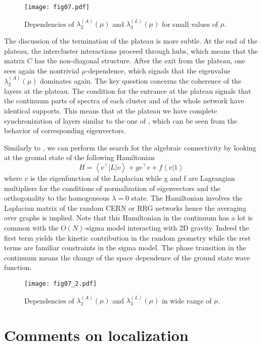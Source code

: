 \documentclass[aps,12pt]{revtex4}
\newcommand{\be}{\begin{equation}}
\newcommand{\ee}{\end{equation}}
\newcommand{\la}{\left<}
\newcommand{\ra}{\right>}
\begin{document}
\begin{figure}[ht]
\centerline{\texttt{[image: fig07.pdf]}}
\caption{Dependencies of $\lambda_2^{(A)}(\mu)$ and $\lambda_3^{(L)}(\mu)$ for small values of $\mu$.}
\label{fig:07}
\end{figure}

The discussion of the termination of the plateau is more subtle. At the end of the plateau, the intercluster interactions proceed through hubs, which means that the matrix $C$ has the non-diagonal structure. After the exit from the plateau, one sees again the nontrivial $\mu$-dependence, which signals that the eigenvalue $\lambda_2^{(A)}(\mu)$ dominates again. The key question concerns the coherence of the layers at the plateau. The condition for the entrance at the plateau signals that the continuum parts of spectra of each cluster and of the whole network have identical supports. This means that at the plateau we have complete synchronization of layers similar to the one of \cite{arenas2}, which can be seen from the behavior of corresponding eigenvectors.

Similarly to \cite{arenas2}, we can perform the search for the algebraic connectivity by looking at the ground state of the following Hamiltonian
\be
H=\la v^{\top}|L| v \ra + g v^{\top}v +f\la v|1 \ra
\ee
where $v$ is the eigenfunction of the Laplacian while g and f are Lagrangian multipliers for the conditions of normalization of eigenvectors and the orthogonality to the homogeneous $\lambda=0$ state.  The Hamiltonian involves the Laplacian matrix of the random CERN or RRG networks hence the averaging over graphs is implied. Note that this Hamiltonian in the continuum has a lot is common with the $O(N)$-sigma model interacting with 2D gravity. Indeed the first term yields the kinetic contribution in the random geometry while the rest terms are familiar constraints in the sigma model. The phase transition in the continuum means the change of the space dependence of the ground state wave function.

\begin{figure}[ht]
\centerline{\texttt{[image: fig07\_2.pdf]}}
\caption{Dependencies of $\lambda_2^{(A)}(\mu)$ and $\lambda_3^{(L)}(\mu)$ in wide range of $\mu$.}
\label{fig:07_2}
\end{figure}

\section{Comments on localization}
\end{document}
